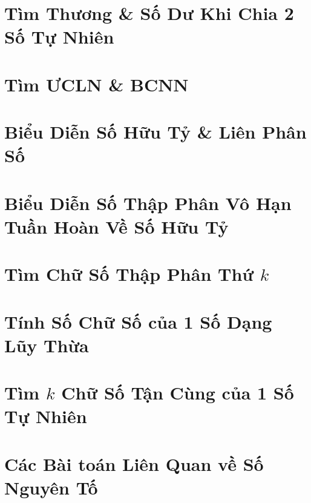 \documentclass{article}
\begin{document}
\section{Tìm Thương \& Số Dư Khi Chia 2 Số Tự Nhiên}


\section{Tìm ƯCLN \& BCNN}


\section{Biểu Diễn Số Hữu Tỷ \& Liên Phân Số}


\section{Biểu Diễn Số Thập Phân Vô Hạn Tuần Hoàn Về Số Hữu Tỷ}


\section{Tìm Chữ Số Thập Phân Thứ $k$}


\section{Tính Số Chữ Số của 1 Số Dạng Lũy Thừa}


\section{Tìm $k$ Chữ Số Tận Cùng của 1 Số Tự Nhiên}


\section{Các Bài toán Liên Quan về Số Nguyên Tố}
\end{document}
